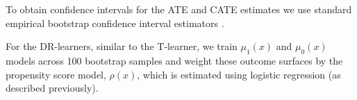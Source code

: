 \documentclass[12pt, a4paper]{article}
\begin{document}


To obtain confidence intervals for the ATE and CATE estimates we use standard
empirical bootstrap confidence interval estimators \citep{efron1986}.



For the DR-learners, similar to the T-learner, we train $\mu_1(x)$ and
$\mu_0(x)$ models across 100 bootstrap samples and weight these outcome
surfaces by the propensity score model, $\rho(x)$, which is estimated using
logistic regression (as described previously). 
\end{document}

